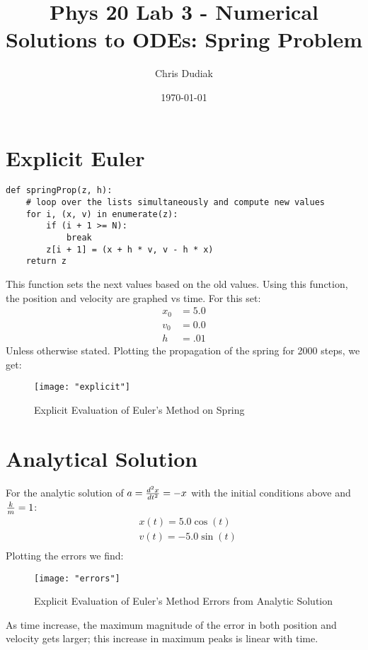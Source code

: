 \documentclass{article}
\begin{document}
\title{Phys 20 Lab 3 - Numerical Solutions to ODEs: Spring Problem}
\author{Chris Dudiak}
\date{\today}
\maketitle

\section{Explicit Euler}
\begin{verbatim}
def springProp(z, h):
    # loop over the lists simultaneously and compute new values
    for i, (x, v) in enumerate(z):
        if (i + 1 >= N):
            break
        z[i + 1] = (x + h * v, v - h * x)
    return z
\end{verbatim}
This function sets the next values based on the old values. Using this function, the position and velocity are graphed vs time. For this set:
\begin{align*}
	x_0 &= 5.0\\
	v_0 &= 0.0\\
	h &= .01
\end{align*}
Unless otherwise stated. Plotting the propagation of the spring for 2000 steps, we get:

\begin{figure}[h!]
	\centering
	\texttt{[image: "explicit"]}
	\caption{Explicit Evaluation of Euler's Method on Spring}
\end{figure} 

\FloatBarrier
\section{Analytical Solution}
For the analytic solution of $a = {d^2x \over dt^2} = -x$ with the initial conditions above and ${k\over m}  = 1$:
\begin{align*}
	&x(t) = 5.0\cos(t)\\
	&v(t) = -5.0\sin(t)\\
\end{align*}
Plotting the errors we find:
\begin{figure}[h!]
	\centering
	\texttt{[image: "errors"]}
	\caption{Explicit Evaluation of Euler's Method Errors from Analytic Solution}
\end{figure} 
\FloatBarrier
As time increase, the maximum magnitude of the error in both position and velocity gets larger; this increase in maximum peaks is linear with time.
\end{document}
